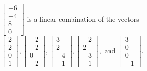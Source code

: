 \begin{exercise}
\begin{exerciseStatement}
  \end{exerciseStatement}
  \begin{exerciseAnswer}
   \(\left[\begin{array}{c}
-6 \\
-4 \\
8 \\
0
\end{array}\right]\) 
  	 is  
	a linear combination of the vectors \(\left[\begin{array}{c}
2 \\
2 \\
0 \\
1
\end{array}\right] , \left[\begin{array}{c}
-2 \\
-2 \\
0 \\
-2
\end{array}\right] , \left[\begin{array}{c}
3 \\
2 \\
-4 \\
-1
\end{array}\right] , \left[\begin{array}{c}
-2 \\
2 \\
-3 \\
-1
\end{array}\right] , \text{ and } \left[\begin{array}{c}
3 \\
0 \\
0 \\
-1
\end{array}\right]\).

	
  


  \end{exerciseAnswer}
\end{exercise}